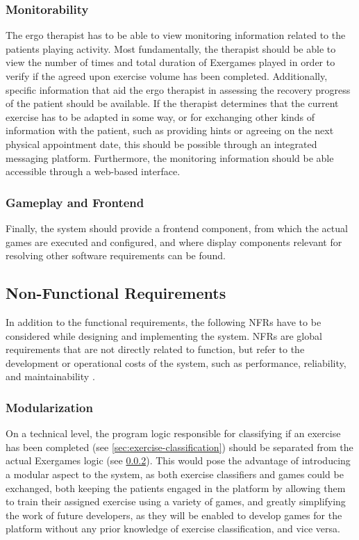 \subsubsection{Monitorability}
\label{sec:req:monitorability}
The ergo therapist has to be able to view monitoring information related to the patients playing activity. Most fundamentally, the therapist should be able to view the number of times and total duration of Exergames played in order to verify if the agreed upon exercise volume has been completed. Additionally, specific information that aid the ergo therapist in assessing the recovery progress of the patient should be available. If the therapist determines that the current exercise has to be adapted in some way, or for exchanging other kinds of information with the patient, such as providing hints or agreeing on the next physical appointment date, this should be possible through an integrated messaging platform. Furthermore, the monitoring information should be able accessible through a web-based interface.

\subsubsection{Gameplay and Frontend}
\label{sec:gameplay}
Finally, the system should provide a frontend component, from which the actual games are executed and configured, and where display components relevant for resolving other software requirements can be found.

\subsection{Non-Functional Requirements}
In addition to the functional requirements, the following \glspl{NFR} have to be considered while designing and implementing the system. \glspl{NFR} are global requirements that are not directly related to function, but refer to the development or operational costs of the system, such as performance, reliability, and maintainability \cite{chung2012non}.

\subsubsection{Modularization}
On a technical level, the program logic responsible for classifying if an exercise has been completed (see \ref{sec:exercise-classification}) should be separated from the actual Exergames logic (see \ref{sec:gameplay}). This would pose the advantage of introducing a modular aspect to the system, as both exercise classifiers and games could be exchanged, both keeping the patients engaged in the platform by allowing them to train their assigned exercise using a variety of games, and greatly simplifying the work of future developers, as they will be enabled to develop games for the platform without any prior knowledge of exercise classification, and vice versa.

